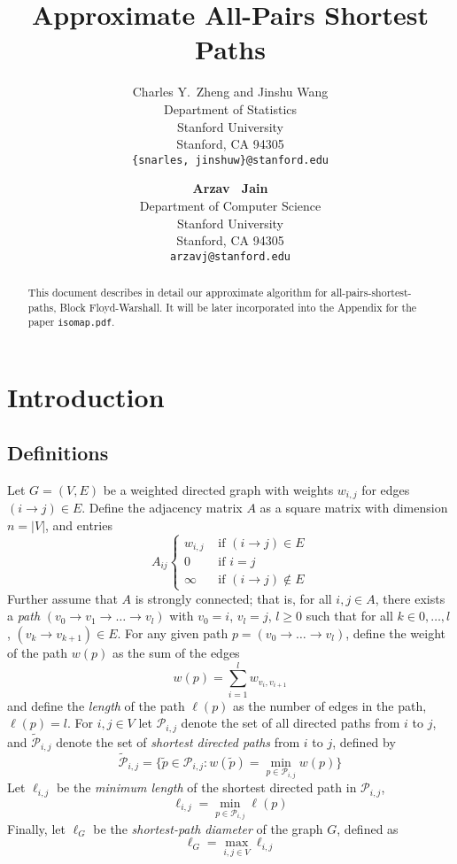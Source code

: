\documentclass{article} %
\title{Approximate All-Pairs Shortest Paths}
\author{
Charles Y.~Zheng and Jinshu Wang\\
Department of Statistics\\
Stanford University\\
Stanford, CA 94305 \\
\texttt{\{snarles, jinshuw\}@stanford.edu} \\
\and
\textbf{Arzav ~Jain} \\
Department of Computer Science\\
Stanford University\\
Stanford, CA 94305 \\
\texttt{arzavj@stanford.edu} \\
}
\begin{document}
\maketitle

\begin{abstract}
  This document describes in detail our approximate algorithm for
  all-pairs-shortest-paths, Block Floyd-Warshall.  It will be later
  incorporated into the Appendix for the paper {\tt isomap.pdf}.
\end{abstract}

\section{Introduction}

\subsection{Definitions}

Let $G = (V, E)$ be a weighted directed graph with weights $w_{i,j}$ for edges $(i \to j) \in E$.
Define the adjacency matrix $A$ as a square matrix with dimension $n = |V|$, and entries
\[
A_{ij}
\begin{cases}
w_{i, j} &\text{ if } (i \to j) \in E\\
0 &\text{ if } i = j\\
\infty &\text{ if } (i \to j) \notin E
\end{cases}
\]
Further assume that $A$ is strongly connected; that is, for all $i, j
\in A$, there exists a \emph{path} $(v_0 \to v_1 \to \hdots \to v_l)$
with $v_0 = i$, $v_l = j$, $l \geq 0$ such that for all $k \in 0,
\hdots, l$, $(v_k \to v_{k+1}) \in E$.  For any given path $p = (v_0
\to \hdots \to v_l)$, define the weight of the path $w(p)$ as the sum
of the edges
\[
w(p) = \sum_{i=1}^l w_{v_i, v_{i+1}}
\]
and define the \emph{length} of the path $\ell(p)$ as the number of
edges in the path, $\ell(p) = l$.  For $i, j \in V$ let
$\mathcal{P}_{i,j}$ denote the set of all directed paths from $i$ to
$j$, and $\tilde{\mathcal{P}}_{i, j}$ denote the set of \emph{shortest
  directed paths} from $i$ to $j$, defined by
\[
\tilde{\mathcal{P}}_{i,j} = \{\tilde{p} \in \mathcal{P}_{i,j}: w(\tilde{p}) = \min_{p \in \mathcal{P}_{i,j}} w(p)\}
\]
Let $\ell_{i,j}$ be the \emph{minimum length} of the shortest directed
path in $\mathcal{P}_{i,j}$,
\[
\ell_{i,j} = \min_{p \in \mathcal{P}_{i,j}} \ell(p)
\]
Finally, let $\ell_G$ be the \emph{shortest-path diameter} of the graph $G$, defined as
\[
\ell_G = \max_{i, j \in V} \ell_{i, j}
\]
\end{document}
